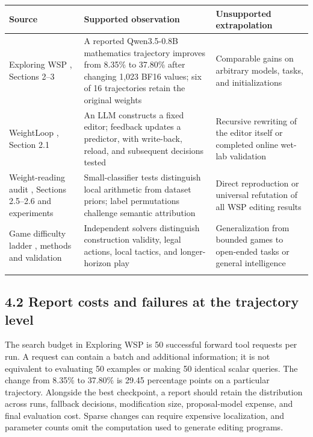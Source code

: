 \begingroup\small\setlength{\tabcolsep}{5pt}\renewcommand{\arraystretch}{1.18}

\begin{longtable}{>{\raggedright\arraybackslash}p{4.85cm}>{\raggedright\arraybackslash}p{4.85cm}>{\raggedright\arraybackslash}p{4.85cm}}

\toprule

\textbf{Source} & \textbf{Supported observation} & \textbf{Unsupported extrapolation}\\\midrule\endhead

Exploring WSP \cite{r1}, Sections 2–3 & A reported Qwen3.5-0.8B mathematics trajectory improves from 8.35\% to 37.80\% after changing 1,023 BF16 values; six of 16 trajectories retain the original weights & Comparable gains on arbitrary models, tasks, and initializations\\\addlinespace[3pt]

WeightLoop \cite{r48}, Section 2.1 & An LLM constructs a fixed editor; feedback updates a predictor, with write-back, reload, and subsequent decisions tested & Recursive rewriting of the editor itself or completed online wet-lab validation\\\addlinespace[3pt]

Weight-reading audit \cite{r49}, Sections 2.5–2.6 and experiments & Small-classifier tests distinguish local arithmetic from dataset priors; label permutations challenge semantic attribution & Direct reproduction or universal refutation of all WSP editing results\\\addlinespace[3pt]

Game difficulty ladder \cite{r50}, methods and validation & Independent solvers distinguish construction validity, legal actions, local tactics, and longer-horizon play & Generalization from bounded games to open-ended tasks or general intelligence\\\addlinespace[3pt]

\bottomrule\end{longtable}\endgroup

\subsection*{4.2 Report costs and failures at the trajectory level}

The search budget in Exploring WSP is 50 successful forward tool requests per run.\cite{r1} A request can contain a batch and additional information; it is not equivalent to evaluating 50 examples or making 50 identical scalar queries. The change from 8.35\% to 37.80\% is 29.45 percentage points on a particular trajectory. Alongside the best checkpoint, a report should retain the distribution across runs, fallback decisions, modification size, proposal-model expense, and final evaluation cost. Sparse changes can require expensive localization, and parameter counts omit the computation used to generate editing programs.


